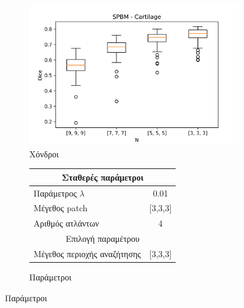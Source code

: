 \documentclass{beamer}
\begin{document}
\begin{frame}
\begin{figure}[H]
    \begin{subfigure}[b]{0.42\linewidth}
    \includegraphics[width=\linewidth]{SPBM_N_Cartilage_plot.png}
    \caption{Χόνδροι}
    \end{subfigure}
    \begin{subfigure}[b]{0.42\linewidth}
        \begin{tabular}[t]{|l|c|} 
            \multicolumn{2}{c}{\footnotesize Σταθερές παράμετροι} \\
            \hline
            \footnotesize Παράμετρος $\lambda$ & \footnotesize 0.01 \\
            \hline
            \footnotesize Μέγεθος patch & \footnotesize [3,3,3] \\
            \hline
            \footnotesize Αριθμός ατλάντων & \footnotesize 4 \\ 
            \hline
            \multicolumn{2}{c}{\footnotesize Επιλογή παραμέτρου} \\
            \hline
            \footnotesize Μέγεθος περιοχής αναζήτησης & \footnotesize  [3,3,3] \\ 
            \hline
        \end{tabular}
    \caption{Παράμετροι}
    \end{subfigure}
\end{figure}

\end{frame}
\end{document}
